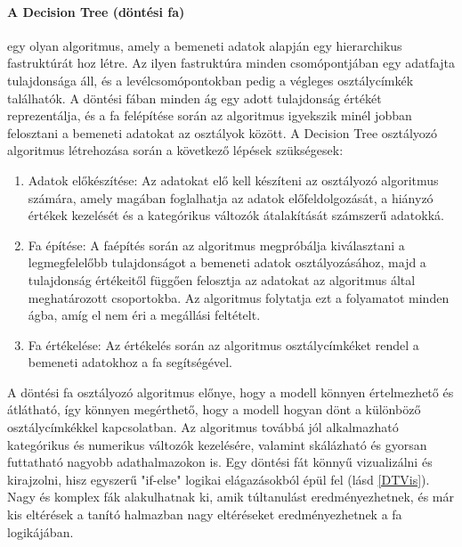 \documentclass[acmtog, authorversion]{acmart}
\begin{document}
\paragraph{A Decision Tree (döntési fa)} egy olyan algoritmus, amely a bemeneti adatok alapján egy hierarchikus fastruktúrát hoz létre. Az ilyen fastruktúra minden csomópontjában egy adatfajta tulajdonsága áll, és a levélcsomópontokban pedig a végleges osztálycímkék találhatók. A döntési fában minden ág egy adott tulajdonság értékét reprezentálja, és a fa felépítése során az algoritmus igyekszik minél jobban felosztani a bemeneti adatokat az osztályok között.
A Decision Tree osztályozó algoritmus létrehozása során a következő lépések szükségesek:
\begin{enumerate}
    \item Adatok előkészítése: Az adatokat elő kell készíteni az osztályozó algoritmus számára, amely magában foglalhatja az adatok előfeldolgozását, a hiányzó értékek kezelését és a kategórikus változók átalakítását számszerű adatokká.
    \item Fa építése: A faépítés során az algoritmus megpróbálja kiválasztani a legmegfelelőbb tulajdonságot a bemeneti adatok osztályozásához, majd a tulajdonság értékeitől függően felosztja az adatokat az algoritmus által meghatározott csoportokba. Az algoritmus folytatja ezt a folyamatot minden ágba, amíg el nem éri a megállási feltételt.
    \item Fa értékelése: Az értékelés során az algoritmus osztálycímkéket rendel a bemeneti adatokhoz a fa segítségével.
\end{enumerate}
A döntési fa osztályozó algoritmus előnye, hogy a modell könnyen értelmezhető és átlátható, így könnyen megérthető, hogy a modell hogyan dönt a különböző osztálycímkékkel kapcsolatban. Az algoritmus továbbá jól alkalmazható kategórikus és numerikus változók kezelésére, valamint skálázható és gyorsan futtatható nagyobb adathalmazokon is.
Egy döntési fát könnyű vizualizálni és kirajzolni, hisz egyszerű "if-else" logikai elágazásokból épül fel (lásd \ref{DTVis}). Nagy és komplex fák alakulhatnak ki, amik túltanulást eredményezhetnek, és már kis eltérések a tanító halmazban nagy eltéréseket eredményezhetnek a fa logikájában.
\end{document}
